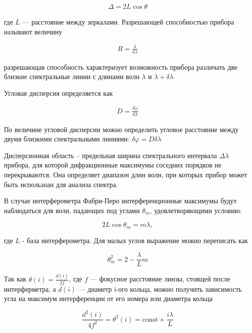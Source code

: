\documentclass[a4paper,12pt]{article}
\begin{document}
\begin{align*}
    \Delta = 2L\cos\theta
\end{align*}

где $L$ --- расстояние между зеркалами.
Разрешающей способностью прибора называют величину

\begin{align*}
    R = \frac{\lambda}{\delta\lambda}
\end{align*}

разрешающая способность характеризует возможность прибора различать
две близкие спектральные линии с длинами волн $\lambda$ и $\lambda+\delta\lambda$

Угловая дисперсия определяется как

\begin{align*}
    D = \frac{d\varphi}{d\lambda}
\end{align*} 

По величине угловой дисперсии можно определить угловое расстояние между двумя
близкими спектральными линиями: $\delta\varphi = D\delta\lambda$

Дисперсионная область – предельная ширина спектрального интервала $\Delta\lambda$ прибора, для которой дифракционные максимумы соседних порядков не перекрываются. Она определяет диапазон
длин волн, при которых прибор может быть использоан для анализа спектра.

В случае интерферометра Фабри-Перо интерференционные
максимумы будут наблюдаться для волн, падающих под углами $\theta_{m}$, удовлетворяющими
условию:

\begin{equation}\label{max_inter}
    2L\cos{\theta_{m}} = m\lambda,
\end{equation}

где $L$ - база интерферометра. Для малых углов выражение можно переписать как 

\begin{equation}
    \label{eq:1}
    \theta_m^2 = 2 - \frac{\lambda}{L}m
\end{equation}

Так как  $\theta(i) = \frac{d(i)}{2f}$, где $f$ --- фокусное расстояние линзы, стоящей после интерферметра, а $d(i)$ --- диаметр i-ого кольца, можно
получить зависимость угла на максимум интерференции от его номера или диаметра кольца 

\begin{equation}
    \label{eq:2}
    \frac{d^2(i)}{4f^2} = \theta^2(i) = \text{const} + \frac{i\lambda}{L}
\end{equation}
\end{document}

